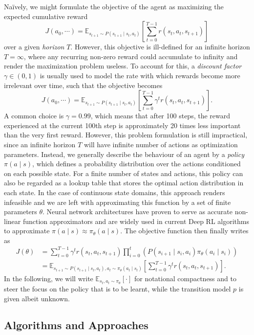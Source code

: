 \documentclass[a4paper, 11pt]{article}
\begin{document}
	Na\"ively, we might formulate the objective of the agent as maximizing the expected cumulative reward 
	\[J(a_0,\cdots)=\mathbb{E}_{s_{t+1}\sim P(s_{t+1}\mid s_t,a_t)}\left[\sum_{t=0}^{T-1}r(s_t,a_t,s_{t+1})\right]\]
	over a given \textit{horizon} $T$. However, this objective is ill-defined for an infinite horizon $T=\infty$, where any recurring non-zero reward could accumulate to infinity and render the maximization problem useless. To account for this, a \textit{discount factor} $\gamma\in(0,1)$ is usually used to model the rate with which rewards become more irrelevant over time, such that the objective becomes
	\[J(a_0,\cdots)=\mathbb{E}_{s_{t+1}\sim P(s_{t+1}\mid s_t,a_t)}\left[\sum_{t=0}^{T-1}\gamma^t r(s_t,a_t,s_{t+1})\right].\] 
	A common choice is $\gamma=0.99$, which means that after 100 steps, the reward experienced at the current 100th step is approximately 20 times less important than the very first reward.
	However, this problem formulation is still impractical, since an infinite horizon $T$ will have infinite number of actions as optimization parameters. Instead, we generally describe the behaviour of an agent by a \textit{policy} $\pi(a\mid s)$, which defines a probability distribution over the actions conditioned on each possible state. 
	For a finite number of states and actions, this policy can also be regarded as a lookup table that stores the optimal action distribution in each state. In the case of continuous state domains, this approach renders infeasible and we are left with approximating this function by a set of finite parameters $\theta$.
	Neural network architectures have proven to serve as accurate non-linear function approximators and are widely used in current Deep RL algorithms to approximate $\pi(a\mid s)\approx \pi_\theta(a\mid s)$.
	The objective function then finally writes as
	\begin{align*}
		J(\theta)&=\sum_{t=0}^{T-1}\gamma^t r(s_t,a_t,s_{t+1})\prod_{i=0}^{t}\left(P(s_{i+1}\mid s_i,a_i)\pi_\theta(a_i\mid s_i)\right) \\
		&=\mathbb{E}_{s_{t+1}\sim P(s_{t+1}\mid s_t,a_t),a_t\sim \pi_\theta(a_t\mid s_t)}\left[\sum_{t=0}^{T-1}\gamma^t r(s_t,a_t,s_{t+1})\right].
	\end{align*}
	In the following, we will write $\mathbb{E}_{s_t,a_t\sim \pi_\theta}\left[\cdot \right]$ for notational compactness and to steer the focus on the policy that is to be learnt, while the transition model $p$ is given albeit unknown.
	\subsection{Algorithms and Approaches}
\end{document}
